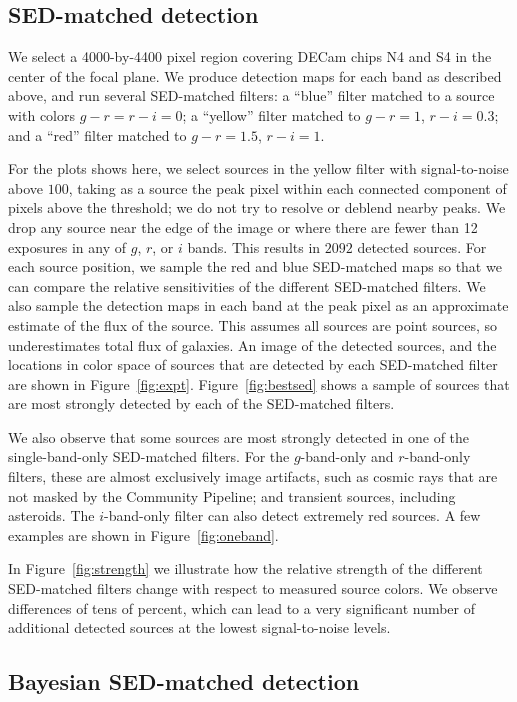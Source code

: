\documentclass[letterpaper,preprint]{aastex62}
\newcommand{\figref}[1]{\mbox{Figure~\ref{#1}}}
\begin{document}
\subsection{SED-matched detection}


We select a 4000-by-4400 pixel region covering DECam chips N4 and S4
in the center of the focal plane.  We produce detection maps for each
band as described above, and run several SED-matched filters: a
``blue'' filter matched to a source with colors $g - r = r - i = 0$; a
``yellow'' filter matched to $g - r = 1$, $r - i = 0.3$; and a ``red''
filter matched to $g - r = 1.5$, $r - i = 1$.

For the plots shows here, we select sources in the yellow filter with
signal-to-noise above $100$, taking as a source the peak pixel within
each connected component of pixels above the threshold; we do not try
to resolve or deblend nearby peaks.  We drop any source near the edge
of the image or where there are fewer than 12 exposures in any of $g$,
$r$, or $i$ bands.  This results in $2092$ detected sources.  For each
source position, we sample the red and blue SED-matched maps so that
we can compare the relative sensitivities of the different SED-matched
filters.  We also sample the detection maps in each band at the peak
pixel as an approximate estimate of the flux of the source.  This
assumes all sources are point sources, so underestimates total flux of
galaxies.  An image of the detected sources, and the locations in
color space of sources that are detected by each SED-matched filter
are shown in \figref{fig:expt}.  \figref{fig:bestsed} shows a sample
of sources that are most strongly detected by each of the SED-matched
filters.

We also observe that some sources are most strongly detected in one of
the single-band-only SED-matched filters.  For the $g$-band-only and
$r$-band-only filters, these are almost exclusively image artifacts,
such as cosmic rays that are not masked by the Community Pipeline; and
transient sources, including asteroids.  The $i$-band-only filter can
also detect extremely red sources.  A few examples are shown in
\figref{fig:oneband}.

In \figref{fig:strength} we illustrate how the relative strength of
the different SED-matched filters change with respect to measured
source colors.  We observe differences of tens of percent, which can
lead to a very significant number of additional detected sources at
the lowest signal-to-noise levels.

\subsection{Bayesian SED-matched detection}
\end{document}
